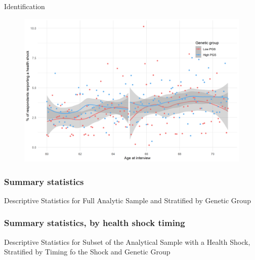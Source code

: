 \documentclass[10pt,compress,xcolor=dvipsnames]{beamer}    %
\newcounter{ex}
\newcommand{\1}[1]{\mathrm{1\hspace*{-2.5pt}l}[#1]}	%
\begin{document}
\begin{frame}{Identification}\label{frame:id2}


\begin{figure}[hbtp]
\centering
\includegraphics[width=0.9\textheight]{../../3_output/over_time/graph_6070cvrdd_agebypgs.png}
\label{fig:cv_prob_rdd}
\end{figure}

\end{frame}

\begin{frame}
\frametitle{Summary statistics}\label{frame:sumstats}
\begin{table}[ht]
	\caption{Descriptive Statistics for Full Analytic Sample and Stratified by Genetic Group}
	\small\resizebox{\textwidth}{!}{
		
	}
\end{table}

\hyperlink{frame:sumstats2}{}

\end{frame}

\begin{frame}
\frametitle{Summary statistics, by health shock timing}\label{frame:sumstats2}

\begin{table}[ht]
	\caption{Descriptive Statistics for Subset of the Analytical Sample with a Health Shock, Stratified by Timing fo the Shock and Genetic Group}
	\small\resizebox{0.7\textwidth}{!}{
		
	}
\end{table}


\hyperlink{frame:sumstats}{}
\end{frame}
\end{document}
